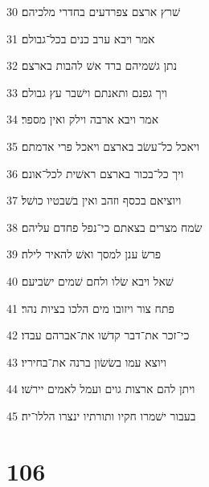 \par 30 שׁרץ ארצם צפרדעים בחדרי מלכיהם׃
\par 31 אמר ויבא ערב כנים בכל־גבולם׃
\par 32 נתן גשׁמיהם ברד אשׁ להבות בארצם׃
\par 33 ויך גפנם ותאנתם וישׁבר עץ גבולם׃
\par 34 אמר ויבא ארבה וילק ואין מספר׃
\par 35 ויאכל כל־עשׂב בארצם ויאכל פרי אדמתם׃
\par 36 ויך כל־בכור בארצם ראשׁית לכל־אונם׃
\par 37 ויוציאם בכסף וזהב ואין בשׁבטיו כושׁל׃
\par 38 שׂמח מצרים בצאתם כי־נפל פחדם עליהם׃
\par 39 פרשׂ ענן למסך ואשׁ להאיר לילה׃
\par 40 שׁאל ויבא שׂלו ולחם שׁמים ישׂביעם׃
\par 41 פתח צור ויזובו מים הלכו בציות נהר׃
\par 42 כי־זכר את־דבר קדשׁו את־אברהם עבדו׃
\par 43 ויוצא עמו בשׂשׂון ברנה את־בחיריו׃
\par 44 ויתן להם ארצות גוים ועמל לאמים יירשׁו׃
\par 45 בעבור ישׁמרו חקיו ותורתיו ינצרו הללו־יה׃

\chapter{106}

